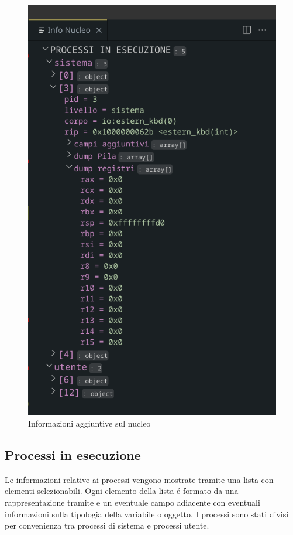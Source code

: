 \begin{figure}[H]
    \centering
    \includegraphics[height=0.3\pdfpageheight]{images/infoNucleo.png}
    \caption{Informazioni aggiuntive sul nucleo}
    \label{fig:infoNucleo}
\end{figure}

\subsection*{Processi in esecuzione}
Le informazioni relative ai processi vengono mostrate tramite una lista con elementi selezionabili. Ogni elemento della lista é formato da una rappresentazione tramite  e un eventuale campo adiacente con eventuali informazioni sulla tipologia della variabile o oggetto. I processi sono stati divisi per convenienza tra processi di sistema e processi utente. 



